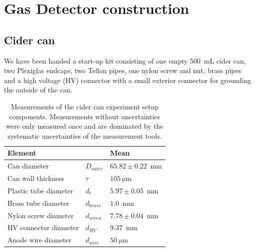 \section{Gas Detector construction}
\label{sec:construction}

\subsection{Cider can}
We have been handed a start-up kit consisting of one empty \SI{500}{\milli\liter}
cider can, two Plexiglas endcaps, two Teflon pipes, one nylon screw and nut,
brass pipes and a high voltage (HV) connector with a small exterior connector for
grounding the outside of the can.

\begin{table}[htb]%
\begin{maybeleft}%
  \begin{tabularx}{\linewidth}{p{3.6cm}p{0.7cm}p{3cm}}
    \textbf{Element}       &               & \textbf{Mean} \\ \hline
    Can diameter           & $D_{outer}$   & $65.82 \pm 0.22$~mm     \\
    Can wall thickness     & $\tau$        & $\SI{105}{\micro\meter}$   \\
    Plastic tube diameter  & $d_{t}$       & $5.97 \pm 0.05$~mm       \\
    Brass tube diameter    & $d_{brass}$   & $1.0$~mm       \\
    Nylon screw diameter   & $d_{screw}$   & $7.78 \pm 0.04$~mm       \\
    HV connector diameter  & $d_{HV}$      & $9.37$~mm      \\
    Anode wire diameter    & $d_{wire}$    & $\SI{50}{\micro\meter}$    \\
    \hline
  \end{tabularx}
  \caption{Measurements of the cider can experiment setup components. Measurements without uncertainties were only measured once and are dominated by the systematic uncertainties of the measurement tools.}
  \label{Tab:cidercan_sizes}
\end{maybeleft}%
\end{table}

